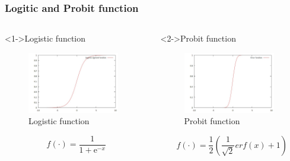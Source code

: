 \documentclass[english,10pt,presentation]{beamer}
\begin{document}
\begin{frame}
\frametitle{Logitic and Probit function}
\label{sec-4_2}
\begin{columns}
\begin{column}{0.5\textwidth}
\begin{exampleblock}<1->{Logistic function}
\label{sec-4_2_1}

    \begin{figure}[htb]
    \centering
    \includegraphics[width=4cm,angle=0]{./logistic.jpg}
    \caption{\label{fig:log}Logistic function}
    \end{figure}
\begin{displaymath}
f(\cdot) = \frac{1}{1+\mathrm{e}^{-x}}
\end{displaymath}
\end{exampleblock}
\end{column}
\begin{column}{0.5\textwidth}
\begin{exampleblock}<2->{Probit function}
\label{sec-4_2_2}

    \begin{figure}[htb]
    \centering
    \includegraphics[width=4cm,angle=0]{./erf.jpg}
    \caption{\label{fig: probit}Probit function}
    \end{figure}
\begin{displaymath}
f(\cdot) = \frac{1}{2}(\frac{1}{\sqrt{2}}erf(x) + 1)
\end{displaymath}
\end{exampleblock}
\end{column}
\end{columns}
\end{frame}
\end{document}
